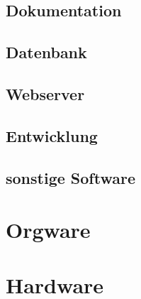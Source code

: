 \documentclass[a4paper]{scrreprt}
\begin{document}
        \subsection{Dokumentation}
            
        \subsection{Datenbank}
           
        \subsection{Webserver}
            
        \subsection{Entwicklung}
           
        \subsection{sonstige Software}
           
    \section{Orgware}
       
    \section{Hardware}
        
\printglossaries
\end{document}
